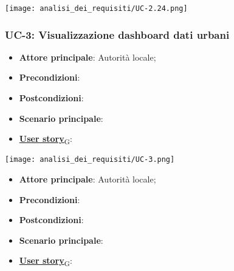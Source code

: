 \begin{center}
	\texttt{[image: analisi\_dei\_requisiti/UC-2.24.png]}
\end{center}

\subsubsection{UC-3: Visualizzazione dashboard dati urbani}
\begin{itemize}
	\item \textbf{Attore principale}: Autorità locale;
	\item \textbf{Precondizioni}:
	\item \textbf{Postcondizioni}:
	\item \textbf{Scenario principale}:
	\item \href{https://7last.github.io/docs/rtb/documentazione-interna/glossario\#user-story}{\textbf{User story}\textsubscript{G}}:
\end{itemize}

\begin{center}
	\texttt{[image: analisi\_dei\_requisiti/UC-3.png]}
\end{center}

\begin{itemize}
	\item \textbf{Attore principale}: Autorità locale;
	\item \textbf{Precondizioni}:
	\item \textbf{Postcondizioni}:
	\item \textbf{Scenario principale}:
	\item \href{https://7last.github.io/docs/rtb/documentazione-interna/glossario\#user-story}{\textbf{User story}\textsubscript{G}}:
\end{itemize}

